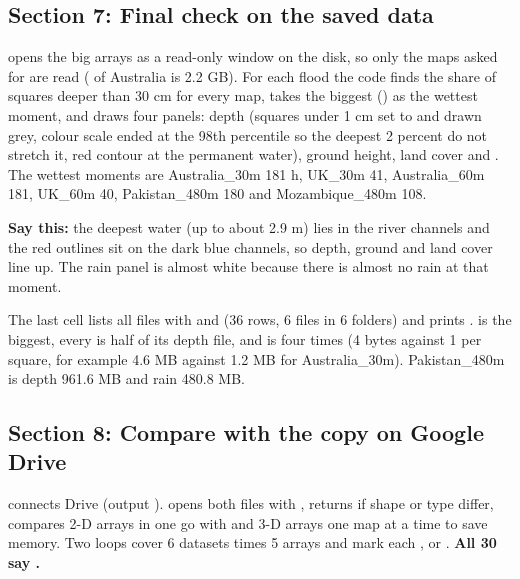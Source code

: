 \subsection{Section 7: Final check on the saved data}

 opens the big arrays as a read-only window on the disk, so only the maps asked for are read ( of Australia is 2.2 GB). For each flood the code finds the share of squares deeper than 30 cm for every map, takes the biggest () as the wettest moment, and draws four panels: depth (squares under 1 cm set to  and drawn grey, colour scale ended at the 98th percentile so the deepest 2 percent do not stretch it, red contour at the permanent water), ground height, land cover and . The wettest moments are Australia\_30m 181 h, UK\_30m 41, Australia\_60m 181, UK\_60m 40, Pakistan\_480m 180 and Mozambique\_480m 108.


\textbf{Say this:} the deepest water (up to about 2.9 m) lies in the river channels and the red outlines sit on the dark blue channels, so depth, ground and land cover line up. The rain panel is almost white because there is almost no rain at that moment.

The last cell lists all files with  and  (36 rows, 6 files in 6 folders) and prints .  is the biggest, every  is half of its depth file, and  is four times  (4 bytes against 1 per square, for example 4.6 MB against 1.2 MB for Australia\_30m). Pakistan\_480m is depth 961.6 MB and rain 480.8 MB.


\subsection{Section 8: Compare with the copy on Google Drive}

 connects Drive (output ).  opens both files with , returns  if shape or type differ, compares 2-D arrays in one go with  and 3-D arrays one map at a time to save memory. Two loops cover 6 datasets times 5 arrays and mark each ,  or . \textbf{All 30 say .}

